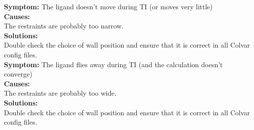 \documentclass[9pt,tutorial]{Styling/livecoms}
\newcommand{\jesse}[1]{\textcolor{green}{Jesse: #1}}
\newcommand{\textInput}[1]{
  \texttt{#1}
}
\begin{document}
\noindent\textbf{Symptom:} The ligand doesn't move during TI (or moves very little)\\
\textbf{Causes:}\\
The restraints are probably too narrow.\\
\textbf{Solutions:}\\
Double check the choice of wall position and ensure that it is correct in all Colvar config files.\\

\noindent\textbf{Symptom:} The ligand flies away during TI (and the calculation doesn't converge)\\
\textbf{Causes:}\\
The restraints are probably too wide.\\
\textbf{Solutions:}\\
Double check the choice of wall position and ensure that it is correct in all Colvar config files.\\


\end{document}

